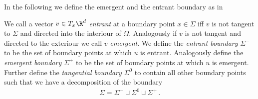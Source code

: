 In the following we define the emergent and the entrant boundary as in \cite[p.282]{Morse1970}
\begin{definition}\label{df:emergentEntrantBd}
  We call a vector $v\in T_x\R^d$ \emph{entrant} at a boundary point $x\in\Sigma$ iff $v$ is not tangent to $\Sigma$
  and directed into the interiour of $\Omega$. Analogously if $v$ is not tangent and
  directed to the exteriour we call $v$ \emph{emergent}.
  We define the \emph{entrant boundary} $\Sigma^-$ to be the set of boundary points at which $u$ is entrant.
  Analogously define the \emph{emergent boundary} $\Sigma^+$ to be the set of boundary points at which
  $u$ is emergent.
  Further define the \emph{tangential boundary} $\Sigma^0$ to contain all other boundary points such that we have a decomposition
  of the boundary
  \begin{align*}
    \Sigma=\Sigma^-\sqcup\Sigma^0\sqcup\Sigma^+\,.
  \end{align*}
\end{definition}


